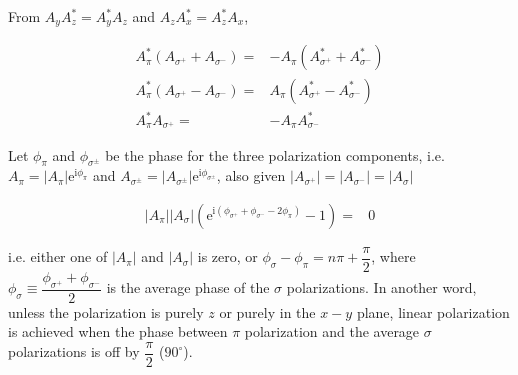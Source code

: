 \documentclass[10pt,fleqn]{article}
\newcommand{\ue}{\mathrm{e}}
\newcommand{\ui}{\mathrm{i}}
\newcommand{\eqar}[1]
{
  \begin{align}
    #1
  \end{align}
}
\newcommand{\paren}[1]{{\left({#1}\right)}}
\newcommand{\abs}[1]{{\left|{#1}\right|}}
\begin{document}
From $A_yA_z^*=A_y^*A_z$ and $A_zA_x^*=A_z^*A_x$,
\eqar{
  A_\pi^*\paren{A_{\sigma^+}+A_{\sigma^-}}=&-A_\pi\paren{A_{\sigma^+}^*+A_{\sigma^-}^*}\\
  A_\pi^*\paren{A_{\sigma^+}-A_{\sigma^-}}=&A_\pi\paren{A_{\sigma^+}^*-A_{\sigma^-}^*}\\
  A_\pi^*A_{\sigma^+}=&-A_\pi A_{\sigma^-}^*
}
Let $\phi_\pi$ and $\phi_{\sigma^\pm}$ be the phase for the three polarization components,
i.e. $A_\pi=\abs{A_\pi}\ue^{\ui\phi_\pi}$ and
$A_{\sigma^\pm}=\abs{A_{\sigma^\pm}}\ue^{\ui\phi_{\sigma^\pm}}$,
also given $\abs{A_{\sigma^+}}=\abs{A_{\sigma^-}}=\abs{A_{\sigma}}$
\eqar{
  \abs{A_\pi}\abs{A_{\sigma}}\paren{\ue^{\ui\paren{\phi_{\sigma^+}+\phi_{\sigma^-}-2\phi_\pi}}-1}=&0
}
i.e. either one of $\abs{A_\pi}$ and $\abs{A_{\sigma}}$ is zero,
or $\phi_\sigma-\phi_\pi=n\pi+\dfrac{\pi}2$,
where {\color{red}$\phi_\sigma\equiv\dfrac{\phi_{\sigma^+}+\phi_{\sigma^-}}{2}$}
is the average phase of the $\sigma$ polarizations.
In another word, unless the polarization is purely $z$ or purely in the $x-y$ plane,
linear polarization is achieved when the phase between $\pi$ polarization
and the average $\sigma$ polarizations is off by $\dfrac\pi2$ ($90^\circ$).
\end{document}
